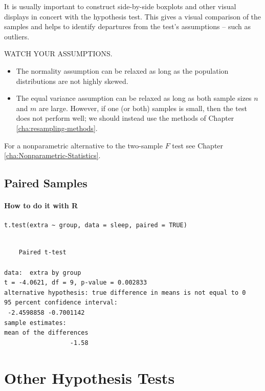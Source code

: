 \documentclass[captions=tableheading]{scrbook}
\begin{document}
\begin{rem}
It is usually important to construct side-by-side boxplots and other visual displays in concert with the hypothesis test. This gives a visual comparison of the samples and helps to identify departures from the test's assumptions -- such as outliers.
\end{rem}

\begin{rem}
WATCH YOUR ASSUMPTIONS.
\begin{itemize}
\item The normality assumption can be relaxed as long as the population distributions are not highly skewed.
\item The equal variance assumption can be relaxed as long as both sample sizes \(n\) and \(m\) are large. However, if one (or both) samples is small, then the test does not perform well; we should instead use the methods of Chapter \ref{cha:resampling-methods}.
\end{itemize}
\end{rem}

For a nonparametric alternative to the two-sample \(F\) test see Chapter \ref{cha:Nonparametric-Statistics}.
\subsection{Paired Samples}
\label{sec-10-3-2}


\paragraph*{How to do it with \textsf{R}}


\begin{verbatim}
t.test(extra ~ group, data = sleep, paired = TRUE)
\end{verbatim}


\begin{verbatim}

	Paired t-test

data:  extra by group 
t = -4.0621, df = 9, p-value = 0.002833
alternative hypothesis: true difference in means is not equal to 0 
95 percent confidence interval:
 -2.4598858 -0.7001142 
sample estimates:
mean of the differences 
                  -1.58
\end{verbatim}
\section{Other Hypothesis Tests}
\label{sec-10-4}
\end{document}

